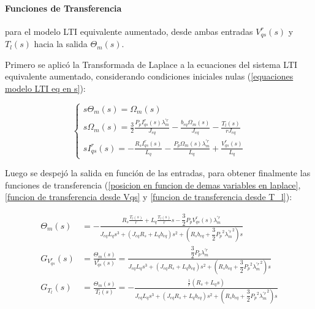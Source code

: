 \documentclass[a4paper, 10pt, onecolumn,journal]{ieeeconf}
\begin{document}
\paragraph{\textbf{Funciones de Transferencia}}
para el modelo LTI equivalente aumentado, desde ambas entradas $V^r_{qs}(s)$ y $T_l(s)$ hacia la salida ${\Theta}_m(s)$.

Primero se aplicó la Transformada de Laplace a la ecuaciones del sistema LTI equivalente aumentado, considerando condiciones iniciales nulas (\cref{equaciones modelo LTI eq en s}):

\begin{equation}
	\begin{cases}
		s{\Theta}_m(s) = {\Omega}_m(s)\\
		s{\Omega}_m(s) = \frac{3}{2} \frac{P_p I^r_{qs}(s)\lambda^{'r}_m}{J_{eq}} - \frac{b_{eq}\Omega_m(s)}{J_{eq}} - \frac{T_l(s)}{r J_{eq}}\\
		s{I}^r_{qs}(s) = -\frac{R_s I^r_{qs}(s)}{L_q} - \frac{P_p \Omega_m(s) \lambda^{'r}_m}{L_q}+ \frac{V^r_{qs}(s)}{L_q}	
	\end{cases}
	\label{equaciones modelo LTI eq en s}
\end{equation}

Luego se despejó la salida en función de las entradas, para obtener finalmente las funciones de transferencia (\cref{posicion en funcion de demas variables en laplace}, \cref{funcion de transferencia desde Vqs} y \cref{funcion de transferencia desde T_l}):

\begin{align}
	{\Theta}_m(s) &= -\frac{R_{s} \frac{T_l(s)}{r} + L_{q} \frac{T_l(s)}{r} s - \dfrac{3}{2} P_{p} V^r_{qs}(s) \lambda^{'r}_m}{J_{eq} L_{q} s^3 +\left( J_{eq} R_{s} + L_{q} b_{eq} \right)s^2 + \left( R_{s} b_{eq} + \dfrac{3}{2} {P_{p}}^2 { \lambda^{'r}_m}^2\right) s}\label{posicion en funcion de demas variables en laplace}\\
	G_{V^r_{qs}}(s) &= \frac{{\Theta}_m(s)}{V^r_{qs}(s)} = \frac{\dfrac{3}{2} P_{p} \lambda^{'r}_m}{J_{eq} L_{q} s^3 +\left( J_{eq} R_{s} + L_{q} b_{eq} \right)s^2 + \left( R_{s} b_{eq} + \dfrac{3}{2} {P_{p}}^2 { \lambda^{'r}_m}^2\right) s}\label{funcion de transferencia desde Vqs}\\
	G_{T_l}(s) &= \frac{{\Theta}_m(s)}{T_l(s)} = -\frac{\frac{1}{r}\left( R_{s} + L_{q} s\right) }{J_{eq} L_{q} s^3 +\left( J_{eq} R_{s} + L_{q} b_{eq} \right)s^2 + \left( R_{s} b_{eq} + \dfrac{3}{2} {P_{p}}^2 { \lambda^{'r}_m}^2\right) s}
	\label{funcion de transferencia desde T_l}
\end{align}
\end{document}
